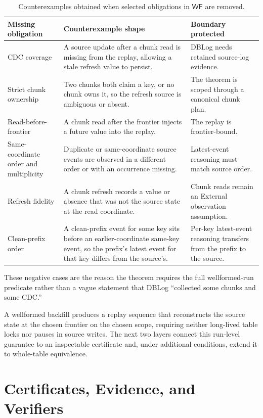 \documentclass[letterpaper,10pt,twocolumn]{article}
\newcommand{\WF}{\mathsf{WF}}
\begin{document}
\begin{table}[t]
\caption{Counterexamples obtained when selected obligations in $\WF$
are removed.}
\label{tab:essential-obligations}
\centering\small
\begin{tabularx}{\textwidth}{@{}p{1.4in}YY@{}}
\toprule
\textbf{Missing obligation} & \textbf{Counterexample shape} &
\textbf{Boundary protected}\\
\midrule
CDC coverage &
  A source update after a chunk read is missing from the replay, allowing a stale
  refresh value to persist. &
  DBLog needs retained source-log evidence.\\
Strict chunk ownership &
  Two chunks both claim a key, or no chunk owns it, so the refresh
  source is ambiguous or absent. &
  The theorem is scoped through a canonical chunk plan.\\
Read-before-frontier &
  A chunk read after the frontier injects a future value into the
  replay. &
  The replay is frontier-bound.\\
Same-coordinate order and multiplicity &
  Duplicate or same-coordinate source events are observed in a
  different order or with an occurrence missing. &
  Latest-event reasoning must match source order.\\
Refresh fidelity &
  A chunk refresh records a value or absence that was not the source
  state at the read coordinate. &
  Chunk reads remain an External observation assumption.\\
Clean-prefix order &
  A clean-prefix event for some key sits before an earlier-coordinate
  same-key event, so the prefix's latest event for that key differs
  from the source's. &
  Per-key latest-event reasoning transfers from the prefix to the
  source.\\
\bottomrule
\end{tabularx}
\end{table}

These negative cases are the reason the theorem
requires the full wellformed-run predicate rather than a vague
statement that DBLog ``collected some chunks and some CDC.''

A wellformed backfill produces a replay sequence that reconstructs the
source state at the chosen frontier on the chosen scope, requiring neither long-lived table
locks nor pauses in source writes. The next two layers connect this run-level guarantee
to an inspectable certificate and, under additional conditions, extend it to whole-table
equivalence.

\section{Certificates, Evidence, and
Verifiers}\label{certificates-evidence-and-verifiers}
\end{document}
